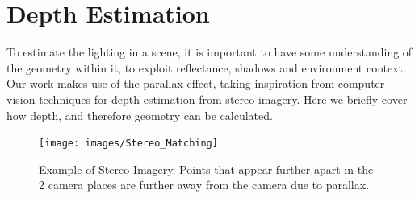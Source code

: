 \documentclass[ %
                    author={Gavin Parker},
                supervisor={Dr. Neill Campbell},
                    degree={MEng},
                     title={Deep Siamese Networks for Illumination Estimation from Stereo Images},
                  subtitle={},
                      type={research},
                      year={2018} ]{dissertation}
\begin{document}
\section{Depth Estimation}
To estimate the lighting in a scene, it is important to have some understanding of the geometry within it, to exploit reflectance, shadows and environment context. Our work makes use of the parallax effect, taking inspiration from computer vision techniques for depth estimation from stereo imagery. Here we briefly cover how depth, and therefore geometry can be calculated.
\begin{figure}[H]
\centering
\texttt{[image: images/Stereo\_Matching]}
\caption{Example of Stereo Imagery. Points that appear further apart in the 2 camera places are further away from the camera due to parallax.}
\end{figure}
\end{document}
